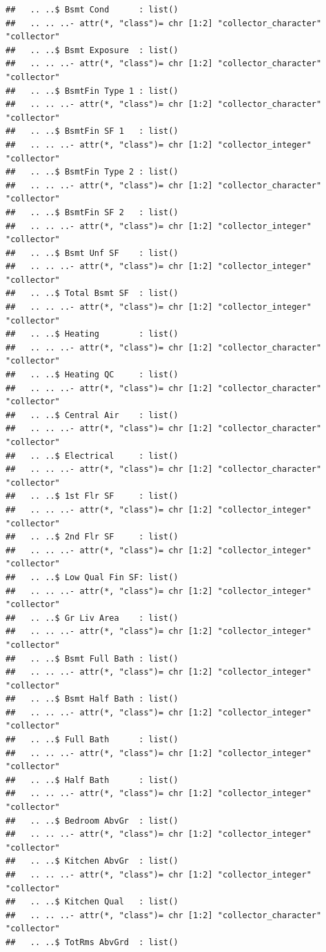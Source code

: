 \documentclass[
]{book}
\theoremstyle{definition}
\theoremstyle{definition}
\theoremstyle{definition}
\theoremstyle{definition}
\theoremstyle{remark}
\begin{document}
\begin{verbatim}
##   .. ..$ Bsmt Cond      : list()
##   .. .. ..- attr(*, "class")= chr [1:2] "collector_character" "collector"
##   .. ..$ Bsmt Exposure  : list()
##   .. .. ..- attr(*, "class")= chr [1:2] "collector_character" "collector"
##   .. ..$ BsmtFin Type 1 : list()
##   .. .. ..- attr(*, "class")= chr [1:2] "collector_character" "collector"
##   .. ..$ BsmtFin SF 1   : list()
##   .. .. ..- attr(*, "class")= chr [1:2] "collector_integer" "collector"
##   .. ..$ BsmtFin Type 2 : list()
##   .. .. ..- attr(*, "class")= chr [1:2] "collector_character" "collector"
##   .. ..$ BsmtFin SF 2   : list()
##   .. .. ..- attr(*, "class")= chr [1:2] "collector_integer" "collector"
##   .. ..$ Bsmt Unf SF    : list()
##   .. .. ..- attr(*, "class")= chr [1:2] "collector_integer" "collector"
##   .. ..$ Total Bsmt SF  : list()
##   .. .. ..- attr(*, "class")= chr [1:2] "collector_integer" "collector"
##   .. ..$ Heating        : list()
##   .. .. ..- attr(*, "class")= chr [1:2] "collector_character" "collector"
##   .. ..$ Heating QC     : list()
##   .. .. ..- attr(*, "class")= chr [1:2] "collector_character" "collector"
##   .. ..$ Central Air    : list()
##   .. .. ..- attr(*, "class")= chr [1:2] "collector_character" "collector"
##   .. ..$ Electrical     : list()
##   .. .. ..- attr(*, "class")= chr [1:2] "collector_character" "collector"
##   .. ..$ 1st Flr SF     : list()
##   .. .. ..- attr(*, "class")= chr [1:2] "collector_integer" "collector"
##   .. ..$ 2nd Flr SF     : list()
##   .. .. ..- attr(*, "class")= chr [1:2] "collector_integer" "collector"
##   .. ..$ Low Qual Fin SF: list()
##   .. .. ..- attr(*, "class")= chr [1:2] "collector_integer" "collector"
##   .. ..$ Gr Liv Area    : list()
##   .. .. ..- attr(*, "class")= chr [1:2] "collector_integer" "collector"
##   .. ..$ Bsmt Full Bath : list()
##   .. .. ..- attr(*, "class")= chr [1:2] "collector_integer" "collector"
##   .. ..$ Bsmt Half Bath : list()
##   .. .. ..- attr(*, "class")= chr [1:2] "collector_integer" "collector"
##   .. ..$ Full Bath      : list()
##   .. .. ..- attr(*, "class")= chr [1:2] "collector_integer" "collector"
##   .. ..$ Half Bath      : list()
##   .. .. ..- attr(*, "class")= chr [1:2] "collector_integer" "collector"
##   .. ..$ Bedroom AbvGr  : list()
##   .. .. ..- attr(*, "class")= chr [1:2] "collector_integer" "collector"
##   .. ..$ Kitchen AbvGr  : list()
##   .. .. ..- attr(*, "class")= chr [1:2] "collector_integer" "collector"
##   .. ..$ Kitchen Qual   : list()
##   .. .. ..- attr(*, "class")= chr [1:2] "collector_character" "collector"
##   .. ..$ TotRms AbvGrd  : list()

\end{verbatim}
\end{document}
